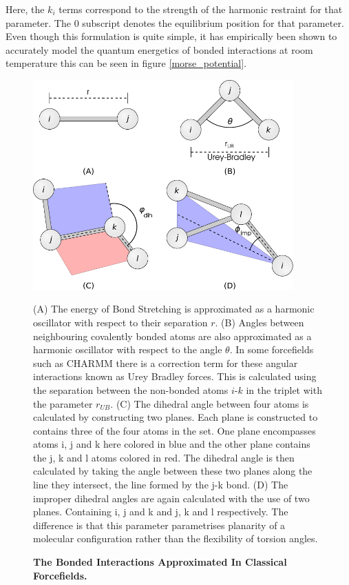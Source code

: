 Here, the $k_i$ terms correspond to the strength of the harmonic restraint for that parameter. The $0$ subscript denotes the equilibrium position for that parameter. Even though this formulation is quite simple, it has empirically been shown to accurately model the quantum energetics of bonded interactions at room temperature this can be seen in figure \ref{morse_potential}.

\begin{figure}
	\begin{center}
	\includegraphics[width=10cm]{figures/bonded_interactions.pdf}
	\end{center}
	\captionsetup{singlelinecheck = false, justification=raggedright}
	\caption[The Bonded Interactions Calculated In Classical Forcefields]{\textbf{The Bonded Interactions Approximated In Classical Forcefields.}}{
		(A) The energy of Bond Stretching is approximated as a harmonic oscillator with respect to their separation $r$. (B) Angles between neighbouring covalently bonded atoms are also approximated as a harmonic oscillator with respect to the angle $\theta$. In some forcefields such as CHARMM there is a correction term for these angular interactions known as Urey Bradley forces. This is calculated using the separation between the non-bonded atoms $i$-$k$ in the triplet with the parameter $r_{UB}$. (C) The dihedral angle between four atoms is calculated by constructing two planes. Each plane is constructed to contains three of the four atoms in the set. One plane encompasses atoms i, j and k here  colored in blue and the other plane contains the j, k and l atoms colored in red. The dihedral angle is then calculated by taking the angle between these two planes along the line they intersect, the line formed by the j-k bond. (D) The improper dihedral angles are again calculated with the use of two planes. Containing i, j and k and j, k and l respectively. The difference is that this parameter parametrises planarity of a molecular configuration rather than the flexibility of torsion angles.
	}
	\label{charmm_bonded}
\end{figure}


